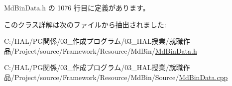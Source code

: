  Md\+Bin\+Data.\+h の 1076 行目に定義があります。



このクラス詳解は次のファイルから抽出されました\+:\begin{DoxyCompactItemize}
\item 
C\+:/\+H\+A\+L/\+P\+G関係/03\+\_\+作成プログラム/03\+\_\+\+H\+A\+L授業/就職作品/\+Project/source/\+Framework/\+Resource/\+Md\+Bin/\mbox{\hyperlink{_md_bin_data_8h}{Md\+Bin\+Data.\+h}}\item 
C\+:/\+H\+A\+L/\+P\+G関係/03\+\_\+作成プログラム/03\+\_\+\+H\+A\+L授業/就職作品/\+Project/source/\+Framework/\+Resource/\+Md\+Bin/\+Source/\mbox{\hyperlink{_md_bin_data_8cpp}{Md\+Bin\+Data.\+cpp}}\end{DoxyCompactItemize}
